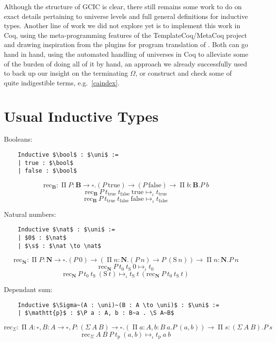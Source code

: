 \documentclass[en]{myarticle}
\renewcommand{\mathtt}{\mathrm}
\newcommand{\uni}[1][]{\square_{#1}}
\newcommand{\red}{\mapsto}
\newcommand{\ired}{\red_\iota}
\renewcommand{\P}{\operatorname{\Pi}}
\renewcommand{\S}{\operatorname{\Sigma}}
\DeclareMathOperator{\?}{?}
\newcommand{\rec}{\mathtt{rec}}
\newcommand{\bool}{\mathbf{B}}
\newcommand{\nat}{\mathbf{N}}
\newcommand{\s}{\mathtt{S}}
\newcommand{\true}{\mathtt{true}}
\newcommand{\false}{\mathtt{false}}
\begin{document}
{Although the structure of GCIC is clear, there still remains some work to do on exact details pertaining to universe levels and full general definitions for inductive types. Another line of work we did not explore yet is to implement this work in Coq, using the meta-programming features of the TemplateCoq/MetaCoq project \cite{Anand2018} and drawing inspiration from the plugins for program translation of \cite{Boulier2017,Pedrot2018}. Both can go hand in hand, using the automated handling of universes in Coq to alleviate some of the burden of doing all of it by hand, an approach we already successfully used to back up our insight on the terminating $\Omega$, or construct and check some of quite indigestible terms, e.g.\ \autoref{caindex}.

{}
\printbibliography

\newpage
{}
\appendix
\appendixpage
\addappheadtotoc
{}

\section{Usual Inductive Types}
\label{indtyex}

	Booleans:
	\begin{lstlisting}
	Inductive $\bool$ : $\uni$ :=
	| true : $\bool$
	| false : $\bool$
	\end{lstlisting}
	\[\rec_{\bool} : \P P : \bool \to \uni. (P~\true) \to (P~\false) \to \P b : \bool. P~b\]
	\[\rec_{\bool}~P~t_{\true}~t_{\false}~\true \ired t_{\true}\]
	\[\rec_{\bool}~P~t_{\true}~t_{\false}~\false \ired t_{\false}\]
	
	Natural numbers:
	\begin{lstlisting}
	Inductive $\nat$ : $\uni$ :=
	| $0$ : $\nat$
	| $\s$ : $\nat \to \nat$
	\end{lstlisting}
	\[\rec_{\nat} : \P P : \nat \to \uni. (P~0) \to (\P n : \nat. (P~n) \to P~(\s~n)) \to \P n : \nat. P~n \]
	\[\rec_{\nat}~P~t_0~t_\s~0 \ired t_0\]
	\[\rec_{\nat}~P~t_0~t_\s~(\s~t) \ired t_\s~t~(\rec_{\nat}~P~t_0~t_\s~t)\]
	
	Dependant sum:
	\begin{lstlisting}
	Inductive $\Sigma~(A : \uni)~(B : A \to \uni)$ : $\uni$ :=
	| $\mathtt{p}$ : $\P a : A, b : B~a . \S A~B$
	\end{lstlisting}
	\[\rec_{\Sigma} : \P A : \uni, B : A \to \uni, P : (\Sigma~A~B) \to \uni. (\P a : A, b : B~a. P~(a,b)) \to \P s : (\Sigma~A~B). P~s \]
	\[\rec_{\Sigma}~A~B~P~t_{\mathtt{p}}~(a,b) \ired t_{\mathtt{p}}~a~b \]
	
}
\end{document}
